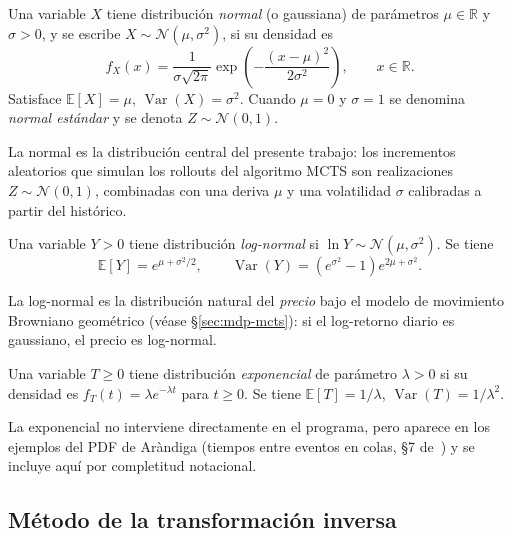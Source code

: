 \begin{definicion}[Normal]
\label{def:normal}
Una variable $X$ tiene distribución \emph{normal} (o gaussiana) de parámetros $\mu \in \mathbb{R}$ y $\sigma > 0$, y se escribe $X \sim \mathcal{N}(\mu, \sigma^2)$, si su densidad es
\[
    f_X(x) = \frac{1}{\sigma\sqrt{2\pi}}\exp\!\left(-\frac{(x-\mu)^2}{2\sigma^2}\right), \qquad x \in \mathbb{R}.
\]
Satisface $\mathbb{E}[X] = \mu$, $\operatorname{Var}(X) = \sigma^2$. Cuando $\mu = 0$ y $\sigma = 1$ se denomina \emph{normal estándar} y se denota $Z \sim \mathcal{N}(0,1)$.
\end{definicion}

La normal es la distribución central del presente trabajo: los incrementos aleatorios que simulan los rollouts del algoritmo MCTS son realizaciones $Z \sim \mathcal{N}(0,1)$, combinadas con una deriva $\mu$ y una volatilidad $\sigma$ calibradas a partir del histórico.

\begin{definicion}
\label{def:lognormal}
Una variable $Y > 0$ tiene distribución \emph{log-normal} si $\ln Y \sim \mathcal{N}(\mu, \sigma^2)$. Se tiene
\[
    \mathbb{E}[Y] = e^{\mu + \sigma^2/2},
    \qquad
    \operatorname{Var}(Y) = \left(e^{\sigma^2} - 1\right)e^{2\mu + \sigma^2}.
\]
\end{definicion}

La log-normal es la distribución natural del \emph{precio} bajo el modelo de movimiento Browniano geométrico (véase §\ref{sec:mdp-mcts}): si el log-retorno diario es gaussiano, el precio es log-normal.

\begin{definicion}[Exponencial]
\label{def:exponencial}
Una variable $T \geq 0$ tiene distribución \emph{exponencial} de parámetro $\lambda > 0$ si su densidad es $f_T(t) = \lambda e^{-\lambda t}$ para $t \geq 0$. Se tiene $\mathbb{E}[T] = 1/\lambda$, $\operatorname{Var}(T) = 1/\lambda^2$.
\end{definicion}

La exponencial no interviene directamente en el programa, pero aparece en los ejemplos del PDF de Aràndiga (tiempos entre eventos en colas, §7 de~\cite{arandiga}) y se incluye aquí por completitud notacional.

\subsection{Método de la transformación inversa}
\label{subsec:transformacion-inversa}


